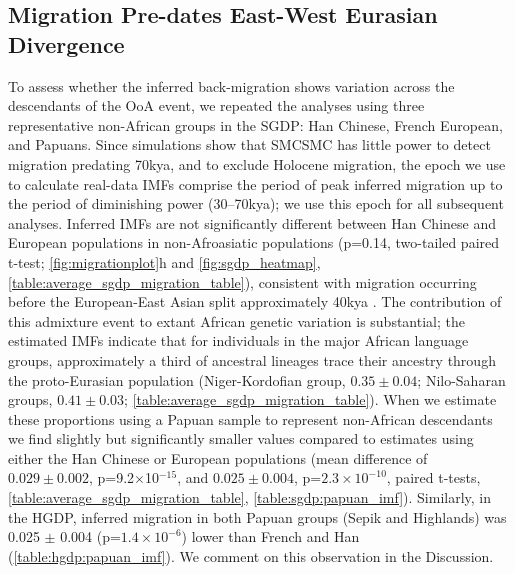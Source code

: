 \subsection{Migration Pre-dates East-West Eurasian Divergence}

To assess whether the inferred back-migration shows variation across the descendants of the OoA event, we repeated the analyses using three representative non-African groups in the SGDP: Han Chinese, French European, and Papuans.  Since simulations show that SMCSMC has little power to detect migration predating 70kya, and to exclude Holocene migration, the epoch we use to calculate real-data IMFs comprise the period of peak inferred migration up to the period of diminishing power (30--70kya); we use this epoch for all subsequent analyses. Inferred IMFs are not significantly different between Han Chinese and European populations in non-Afroasiatic populations (p=0.14, two-tailed paired t-test; \autoref{fig:migrationplot}h and \autoref{fig:sgdp_heatmap}, \autoref{table:average_sgdp_migration_table}), consistent with migration occurring before the European-East Asian split approximately 40kya \cite{Mathieson2014}.  The contribution of this admixture event to extant African genetic variation is substantial; the estimated IMFs indicate that for individuals in the major African language groups, approximately a third of ancestral lineages trace their ancestry through the proto-Eurasian population (Niger-Kordofian group, $0.35\pm 0.04$; Nilo-Saharan groups, $0.41\pm 0.03$; \autoref{table:average_sgdp_migration_table}). When we estimate these proportions using a Papuan sample to represent non-African descendants we find slightly but significantly smaller values compared to estimates using either the Han Chinese or European populations (mean difference of $0.029 \pm 0.002$, p=9.2$\times$10$^{-15}$, and $0.025 \pm 0.004$, p=$2.3\times 10^{-10}$, paired t-tests, \autoref{table:average_sgdp_migration_table}, \autoref{table:sgdp:papuan_imf}). Similarly, in the HGDP, inferred migration in both Papuan groups (Sepik and Highlands) was 0.025 $\pm$ 0.004 (p=$1.4\times10^{-6}$) lower than French and Han (\autoref{table:hgdp:papuan_imf}).  We comment on this observation in the Discussion. 



